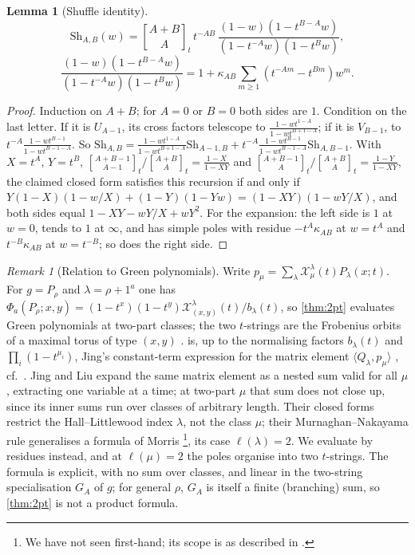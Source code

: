 \documentclass[11pt]{amsart}
\newtheorem{lemma}[theorem]{Lemma}
\theoremstyle{definition}
\theoremstyle{remark}
\newtheorem{remark}[theorem]{Remark}
\numberwithin{equation}{section}
\newcommand{\qbin}[2]{\genfrac{[}{]}{0pt}{}{#1}{#2}_t}
\begin{document}
\begin{lemma}[Shuffle identity]\label{lem:shuffle}
\[ \mathrm{Sh}_{A,B}(w)=\qbin{A+B}{A}\,t^{-AB}\,\frac{(1-w)(1-t^{B-A}w)}{(1-t^{-A}w)(1-t^Bw)}, \]\[ \frac{(1-w)(1-t^{B-A}w)}{(1-t^{-A}w)(1-t^Bw)}=1+\kappa_{AB}\sum_{m\ge1}(t^{-Am}-t^{Bm})w^m. \]
\end{lemma}
\begin{proof}
Induction on $A+B$; for $A=0$ or $B=0$ both sides are $1$. Condition on the last letter. If it is $U_{A-1}$, its cross factors telescope to $\frac{1-wt^{1-A}}{1-wt^{B+1-A}}$; if it is $V_{B-1}$, to $t^{-A}\frac{1-wt^{B-1}}{1-wt^{B-1-A}}$. So $\mathrm{Sh}_{A,B}=\frac{1-wt^{1-A}}{1-wt^{B+1-A}}\mathrm{Sh}_{A-1,B}+t^{-A}\frac{1-wt^{B-1}}{1-wt^{B-1-A}}\mathrm{Sh}_{A,B-1}$. With $X=t^A$, $Y=t^B$, $\qbin{A+B-1}{A-1}/\qbin{A+B}{A}=\frac{1-X}{1-XY}$ and $\qbin{A+B-1}{A}/\qbin{A+B}A=\frac{1-Y}{1-XY}$, the claimed closed form satisfies this recursion if and only if $Y(1-X)(1-w/X)+(1-Y)(1-Yw)=(1-XY)(1-wY/X)$, and both sides equal $1-XY-wY/X+wY^2$. For the expansion: the left side is $1$ at $w=0$, tends to $1$ at $\infty$, and has simple poles with residue $-t^A\kappa_{AB}$ at $w=t^A$ and $t^{-B}\kappa_{AB}$ at $w=t^{-B}$; so does the right side.
\end{proof}
\begin{remark}[Relation to Green polynomials]
Write $p_\mu=\sum_\lambda \mathcal X^\lambda_\mu(t)P_\lambda(x;t)$. For $g=P_\rho$ and $\lambda=\rho+1^a$ one has $\Phi_a(P_\rho;x,y)=(1-t^x)(1-t^y)\mathcal X^{\lambda}_{(x,y)}(t)/b_\lambda(t)$, so \cref{thm:2pt} evaluates Green polynomials at two-part classes; the two $t$-strings are the Frobenius orbits of a maximal torus of type $(x,y)$ \cite{Green55}.  is, up to the normalising factors $b_\lambda(t)$ and $\prod_i(1-t^{\mu_i})$, Jing's constant-term expression for the matrix element $\langle Q_\lambda,p_\mu\rangle$ \cite{Jing91}, cf.\ \cite[(2.17), (2.20)]{JingLiu21}. Jing and Liu \cite[Thm.~2.7]{JingLiu21} expand the same matrix element as a nested sum valid for all $\mu$, extracting one variable at a time; at two-part $\mu$ that sum does not close up, since its inner sums run over classes of arbitrary length. Their closed forms \cite[Thm.~2.10, (2.37)--(2.40)]{JingLiu21} restrict the Hall--Littlewood index $\lambda$, not the class $\mu$; their Murnaghan--Nakayama rule \cite[Thm.~3.2]{JingLiu21} generalises a formula of Morris \cite{Morris77}\footnote{We have not seen \cite{Morris77} first-hand; its scope is as described in \cite[p.~12, before Thm.~3.2]{JingLiu21}.}, its case $\ell(\lambda)=2$. We evaluate by residues instead, and at $\ell(\mu)=2$ the poles organise into two $t$-strings. The formula is explicit, with no sum over classes, and linear in the two-string specialisation $G_A$ of $g$; for general $\rho$, $G_A$ is itself a finite (branching) sum, so \cref{thm:2pt} is not a product formula.
\end{remark}
\end{document}
